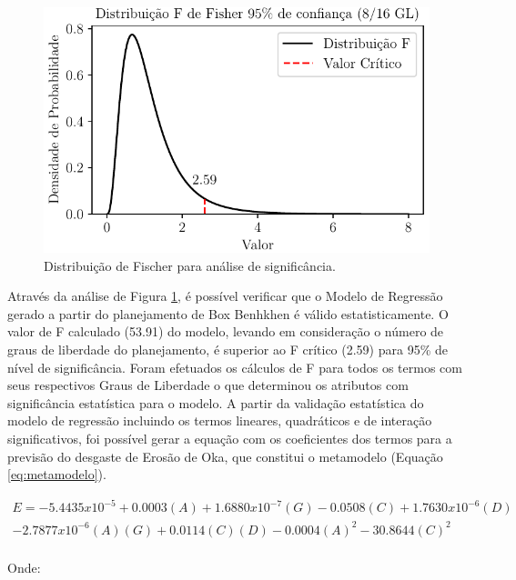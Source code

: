 \begin{figure}[H] 
    \centering  
    \includegraphics{Figuras/fischerbox.pdf}  
    \caption{Distribuição de Fischer para análise de significância.}  
    \label{fig:fischerbox}  
\end{figure}


Através da análise de Figura \ref{fig:fischerbox}, é possível verificar que o Modelo de Regressão gerado a partir do planejamento de Box Benhkhen é válido estatisticamente. O valor de F calculado (53.91) do modelo, levando em consideração o número de graus de liberdade do planejamento, é superior ao F crítico (2.59) para 95\% de nível de significância. Foram efetuados os cálculos
de F para todos os termos com seus respectivos Graus de Liberdade o que determinou os atributos com significância estatística para o modelo. A partir da validação estatística do modelo de regressão incluindo os termos lineares, quadráticos e de interação significativos, foi possível gerar a equação com os coeficientes dos termos para a previsão do desgaste de Erosão de Oka, que constitui o metamodelo (Equação \ref{eq:metamodelo}). 
 

\begin{equation}
\begin{align*} 
E = -5.4435x10^{-5} + 0.0003(A) + 1.6880x10^{-7}(G) - 0.0508(C) + 1.7630x10^{-6}(D)\\ 
- 2.7877x10^{-6}(A)(G) + 0.0114(C)(D) - 0.0004(A)^2 - 30.8644(C)^2 \quad \quad \quad \;  \, \, \, \, \, \, \,\, \\ 
\end{align*}
\label{eq:metamodelo}
\end{equation}

Onde:

